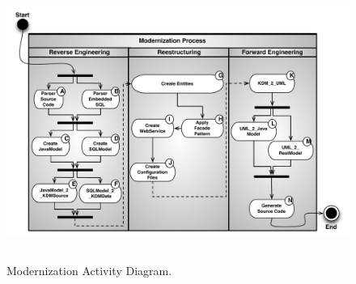 \documentclass[a4paper,twoside]{article}
\begin{document}

 \begin{figure}[!t]
\centering
  \includegraphics[width=16.8cm, height=9cm]{figuras/AllProcess4}
\caption{Modernization Activity Diagram.}
\label{fig:activity_diagram}
\end{figure}
\end{document}
